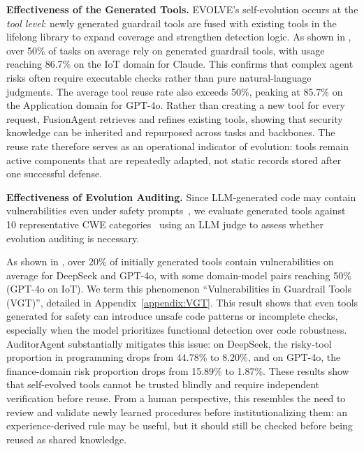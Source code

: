 \textbf{Effectiveness of the Generated Tools.} EVOLVE's self-evolution occurs at the \emph{tool level}: newly generated guardrail tools are fused with existing tools in the lifelong library to expand coverage and strengthen detection logic. As shown in , over 50\% of tasks on average rely on generated guardrail tools, with usage reaching 86.7\% on the IoT domain for Claude. This confirms that complex agent risks often require executable checks rather than pure natural-language judgments. The average tool reuse rate also exceeds 50\%, peaking at 85.7\% on the Application domain for GPT-4o. Rather than creating a new tool for every request, FusionAgent retrieves and refines existing tools, showing that security knowledge can be inherited and repurposed across tasks and backbones. The reuse rate therefore serves as an operational indicator of evolution: tools remain active components that are repeatedly adapted, not static records stored after one successful defense.

\textbf{Effectiveness of Evolution Auditing.} Since LLM-generated code may contain vulnerabilities even under safety prompts~\citep{pearce2025asleep,khoury2023secure}, we evaluate generated tools against 10 representative CWE categories~\cite{MITRE_CWE_2025} using an LLM judge to assess whether evolution auditing is necessary.

As shown in , over 20\% of initially generated tools contain vulnerabilities on average for DeepSeek and GPT-4o, with some domain-model pairs reaching 50\% (GPT-4o on IoT). We term this phenomenon ``Vulnerabilities in Guardrail Tools (VGT)'', detailed in Appendix~\ref{appendix:VGT}. This result shows that even tools generated for safety can introduce unsafe code patterns or incomplete checks, especially when the model prioritizes functional detection over code robustness. AuditorAgent substantially mitigates this issue: on DeepSeek, the risky-tool proportion in programming drops from 44.78\% to 8.20\%, and on GPT-4o, the finance-domain risk proportion drops from 15.89\% to 1.87\%. These results show that self-evolved tools cannot be trusted blindly and require independent verification before reuse. From a human perspective, this resembles the need to review and validate newly learned procedures before institutionalizing them: an experience-derived rule may be useful, but it should still be checked before being reused as shared knowledge.

